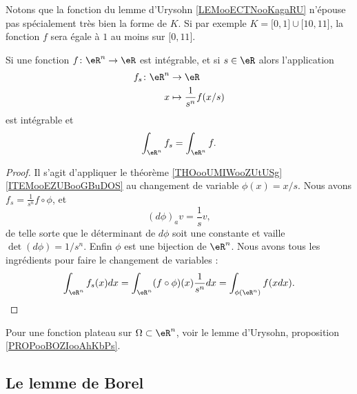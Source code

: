 \begin{normaltext}
	Notons que la fonction du lemme d'Urysohn \ref{LEMooECTNooKagaRU} n'épouse pas spécialement très bien la forme de \( K\). Si par exemple \( K=\mathopen[ 0 , 1 \mathclose]\cup \mathopen[ 10 , 11 \mathclose]\), la fonction \( f\) sera égale à \( 1\) au moins sur \( \mathopen[ 0 , 11 \mathclose]\).
\end{normaltext}


\begin{lemma}		\label{LEMooGZXYooZqFzyc}
	Si une fonction \(f \colon \eR^n\to \eR  \) est intégrable, et si \( s\in \eR\) alors l'application
	\begin{equation}
		\begin{aligned}
			f_s\colon \eR^n & \to \eR                      \\
			x               & \mapsto \frac{1}{ s^n}f(x/s)
		\end{aligned}
	\end{equation}
	est intégrable et
	\begin{equation}
		\int_{\eR^n}f_s=\int_{\eR^n}f.
	\end{equation}
\end{lemma}

\begin{proof}
	Il s'agit d'appliquer le théorème \ref{THOooUMIWooZUtUSg}\ref{ITEMooEZUBooGBuDOS} au changement de variable \( \phi(x)=x/s\). Nous avons \( f_s=\frac{1}{ s^n}f\circ \phi\), et
	\begin{equation}
		(d\phi)_av=\frac{1}{ s}v,
	\end{equation}
	de telle sorte que le déterminant de \( d\phi\) soit une constante et vaille \( \det(d\phi)=1/s^n\). Enfin \( \phi\) est une bijection de \( \eR^n\). Nous avons tous les ingrédients pour faire le changement de variables :
	\begin{equation}
		\int_{\eR^n}f_s(x)dx=  \int_{\eR^n}(f\circ \phi)(x)\frac{1}{ s^n}dx=\int_{\phi(\eR^n)}f(xdx).
	\end{equation}
\end{proof}

Pour une fonction plateau sur \( \Omega\subset \eR^n\), voir le lemme d'Urysohn, proposition \ref{PROPooBOZIooAhKbPs}.

\subsection{Le lemme de Borel}

